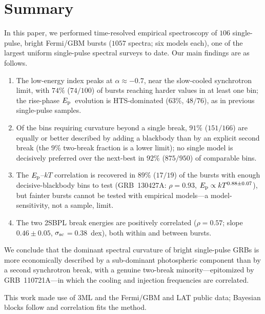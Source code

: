 \documentclass[twocolumn]{aastex631}
\newcommand{\Ep}{\ensuremath{E_{\rm p}}}
\newcommand{\kT}{\ensuremath{kT}}
\newcommand{\ssc}{\ensuremath{\sigma_{\rm sc}}}
\begin{document}
\section{Summary} \label{sec:summary}
In this paper, we performed time-resolved empirical spectroscopy of $106$
single-pulse, bright Fermi/GBM bursts ($1057$ spectra; six models each), one
of the largest uniform single-pulse spectral surveys to date. Our main findings
are as follows.
\begin{enumerate}
\item The low-energy index peaks at $\alpha\approx-0.7$, near the slow-cooled
  synchrotron limit, with $74\%$ ($74/100$) of bursts reaching harder values in
  at least one bin; the rise-phase \Ep\ evolution is HTS-dominated
  ($63\%$, $48/76$), as in previous single-pulse samples.
\item Of the bins requiring curvature beyond a single break, $91\%$ ($151/166$)
  are equally or better described by adding a blackbody than by an explicit
  second break (the $9\%$ two-break fraction is a lower limit); no single model
  is decisively preferred over the next-best in $92\%$ ($875/950$) of
  comparable bins.
\item The \citet{Burgess2014a} $\Ep$--$\kT$ correlation is recovered in $89\%$
  ($17/19$) of the bursts with enough decisive-blackbody bins to test
  (GRB~130427A: $\rho=0.93$, $\Ep\propto\kT^{0.88\pm0.07}$), but fainter bursts
  cannot be tested with empirical models---a model-sensitivity, not a sample,
  limit.
\item The two 2SBPL break energies are positively correlated ($\rho=0.57$;
  \citealt{DAgostini2005} slope $0.46\pm0.05$, \ssc$=0.38$~dex), both within
  and between bursts.
\end{enumerate}
We conclude that the dominant spectral curvature of bright single-pulse GRBs is
more economically described by a sub-dominant photospheric component than by a
second synchrotron break, with a genuine two-break minority---epitomized by
GRB~110721A---in which the cooling and injection frequencies are correlated.

\begin{acknowledgments}
This work made use of \textsf{3ML} \citep{Vianello2015} and the Fermi/GBM and LAT
public data; Bayesian blocks follow \citet{Scargle2013} and correlation fits the
\citet{DAgostini2005} method.
\end{acknowledgments}
\end{document}
